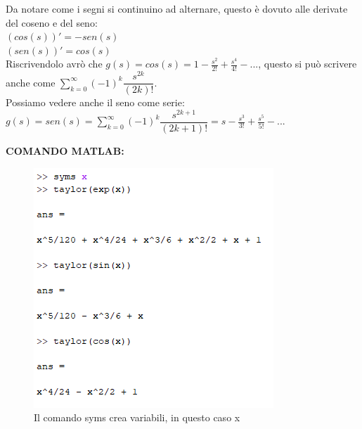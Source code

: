 \pagebreak

Da notare come i segni si continuino ad alternare, questo è dovuto alle derivate del coseno e del seno:\\
$ (cos(s))' = - sen(s)$\\
$ (sen(s))' = cos(s)$\\

Riscrivendolo avrò che $  g(s) = cos(s) = 1 - \frac{s^2}{2!} + \frac{s^4}{4!} -...$, questo si può scrivere anche come $ \sum_{k=0}^\infty (-1)^k \dfrac{s^{2k}}{(2k)!}$. \\

Possiamo vedere anche il seno come serie:\\
$ g(s)=sen(s)= \sum_{k=0}^\infty (-1)^k \dfrac{s^{2k+1}}{(2k+1)!} = s - \frac{s^3}{3!}+\frac{s^5}{5!}-...$

\textbf{COMANDO MATLAB:}\\

\begin{figure}[h]
	\centering
	\includegraphics{immagini/comando1}
	\caption{ Il comando syms crea variabili, in questo caso x }
	\label{fig: Primo comando Matlab}
\end{figure}

